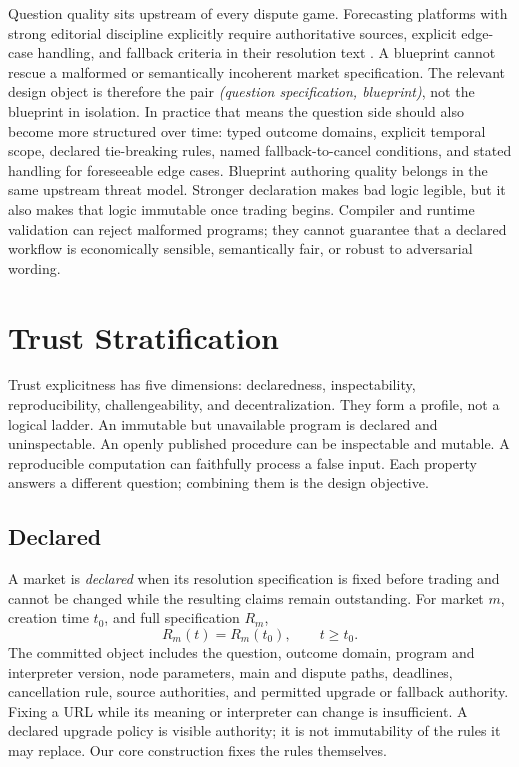 \documentclass[10pt]{article}
\begin{document}
Question quality sits upstream of every dispute game. Forecasting platforms with strong editorial discipline explicitly require authoritative sources, explicit edge-case handling, and fallback criteria in their resolution text \cite{metaculus2026}. A blueprint cannot rescue a malformed or semantically incoherent market specification. The relevant design object is therefore the pair \emph{(question specification, blueprint)}, not the blueprint in isolation. In practice that means the question side should also become more structured over time: typed outcome domains, explicit temporal scope, declared tie-breaking rules, named fallback-to-cancel conditions, and stated handling for foreseeable edge cases. Blueprint authoring quality belongs in the same upstream threat model. Stronger declaration makes bad logic legible, but it also makes that logic immutable once trading begins. Compiler and runtime validation can reject malformed programs; they cannot guarantee that a declared workflow is economically sensible, semantically fair, or robust to adversarial wording.

\section{Trust Stratification}
\label{sec:stratification}

Trust explicitness has five dimensions: declaredness, inspectability, reproducibility, challengeability, and decentralization. They form a profile, not a logical ladder. An immutable but unavailable program is declared and uninspectable. An openly published procedure can be inspectable and mutable. A reproducible computation can faithfully process a false input. Each property answers a different question; combining them is the design objective.

\subsection{Declared}

A market is \emph{declared} when its resolution specification is fixed before trading and cannot be changed while the resulting claims remain outstanding. For market $m$, creation time $t_0$, and full specification $R_m$,
\[
  R_m(t)=R_m(t_0),\qquad t\geq t_0.
\]
The committed object includes the question, outcome domain, program and interpreter version, node parameters, main and dispute paths, deadlines, cancellation rule, source authorities, and permitted upgrade or fallback authority. Fixing a URL while its meaning or interpreter can change is insufficient. A declared upgrade policy is visible authority; it is not immutability of the rules it may replace. Our core construction fixes the rules themselves.
\end{document}
